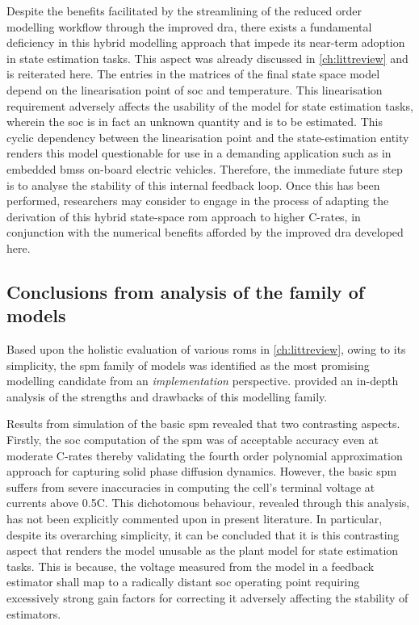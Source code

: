 
Despite   the  benefits facilitated  by   the streamlining  of  the reduced
order  modelling  workflow through  the  improved \gls{dra},  there  exists a
fundamental  deficiency  in this  hybrid  modelling approach  that impede  its
near-term  adoption in  state estimation  tasks. This aspect was already
discussed in \cref{ch:littreview} and is reiterated here. The entries  in  the
matrices  of  the  final  state  space  model  depend  on  the linearisation
point of \gls{soc} and temperature. This linearisation requirement adversely
affects the usability of the model for state estimation tasks, wherein the
\gls{soc} is in fact an unknown quantity and is to be estimated. This cyclic
dependency  between  the linearisation  point  and  the state-estimation  entity
renders this  model questionable for use  in a demanding application  such as in
embedded \glspl{bms} on-board electric vehicles. Therefore, the immediate future
step is to analyse  the stability of this internal feedback  loop. Once this has
been performed,  researchers may consider to  engage in the process  of adapting
the derivation of this hybrid  state-space \gls{rom} approach to higher C-rates,
in conjunction  with the numerical  benefits afforded by the  improved \gls{dra}
developed here.

\subsection{Conclusions from analysis of the  family of models}

Based    upon   the    holistic   evaluation    of   various    \glspl{rom}   in
\cref{ch:littreview},  owing   to  its  simplicity,  the   \gls{spm}  family  of
models  was  identified  as  the  most promising  modelling  candidate  from  an
\emph{implementation}  perspective.   provided an  in-depth
analysis of the strengths and drawbacks of this modelling family.

Results from  simulation of  the basic \gls{spm}  revealed that  two contrasting
aspects. Firstly, the  \gls{soc} computation of the \gls{spm}  was of acceptable
accuracy even at moderate C-rates thereby validating the fourth order polynomial
approximation approach  for capturing  solid phase diffusion  dynamics. However,
the basic  \gls{spm} suffers  from severe inaccuracies  in computing  the cell's
terminal voltage  at currents above  0.5C. This dichotomous  behaviour, revealed
through  this  analysis, has  not  been  explicitly  commented upon  in  present
literature.  In  particular,  despite  its overarching  simplicity,  it  can  be
concluded that it is this contrasting  aspect that renders the model unusable as
the  plant model  for  state  estimation tasks.  This  is  because, the  voltage
measured  from the  model  in a  feedback  estimator shall  map  to a  radically
distant \gls{soc} operating point requiring  excessively strong gain factors for
correcting it adversely affecting the stability of estimators.

